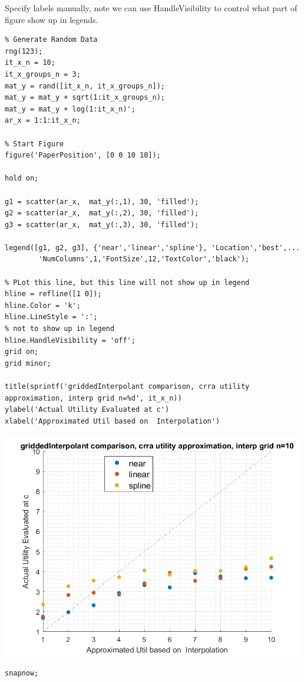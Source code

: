 \documentclass[
]{book}
\begin{document}
Specify labels manually, note we can use HandleVisibility to control
what part of figure show up in legends.

\begin{verbatim}
% Generate Random Data
rng(123);
it_x_n = 10;
it_x_groups_n = 3;
mat_y = rand([it_x_n, it_x_groups_n]);
mat_y = mat_y + sqrt(1:it_x_groups_n);
mat_y = mat_y + log(1:it_x_n)';
ar_x = 1:1:it_x_n;

% Start Figure
figure('PaperPosition', [0 0 10 10]);

hold on;

g1 = scatter(ar_x,  mat_y(:,1), 30, 'filled');
g2 = scatter(ar_x,  mat_y(:,2), 30, 'filled');
g3 = scatter(ar_x,  mat_y(:,3), 30, 'filled');

legend([g1, g2, g3], {'near','linear','spline'}, 'Location','best',...
        'NumColumns',1,'FontSize',12,'TextColor','black');

% PLot this line, but this line will not show up in legend
hline = refline([1 0]);
hline.Color = 'k';
hline.LineStyle = ':';
% not to show up in legend
hline.HandleVisibility = 'off';
grid on;
grid minor;

title(sprintf('griddedInterpolant comparison, crra utility approximation, interp grid n=%d', it_x_n))
ylabel('Actual Utility Evaluated at c')
xlabel('Approximated Util based on  Interpolation')
\end{verbatim}

\includegraphics[width=5.20833in,height=\textheight]{img/fs_titling_images/figure_1.png}

\begin{verbatim}
snapnow;
\end{verbatim}
\end{document}

